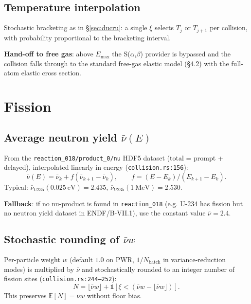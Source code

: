 \documentclass[11pt,a4paper]{article}
\begin{document}
\subsection{Temperature interpolation}

Stochastic bracketing as in \S\ref{sec:ducru}: a single $\xi$
selects $T_j$ or $T_{j+1}$ per collision, with probability
proportional to the bracketing interval.

\textbf{Hand-off to free gas}: above $E_\text{max}$ the
S($\alpha$,$\beta$) provider is bypassed and the collision
falls through to the standard free-gas elastic model
(\S4.2) with the full-atom elastic cross section.

\section{Fission}

\subsection{Average neutron yield $\bar{\nu}(E)$}

From the \texttt{reaction\_018/product\_0/nu} HDF5 dataset
(total = prompt + delayed), interpolated linearly in energy
(\texttt{collision.rs:156}):
\begin{equation}
\bar\nu(E) = \bar\nu_k + f(\bar\nu_{k+1} - \bar\nu_k),
\qquad f = (E - E_k)/(E_{k+1} - E_k).
\end{equation}
Typical: $\bar\nu_{U235}(0.025~\mathrm{eV}) = 2.435$,
$\bar\nu_{U235}(1~\mathrm{MeV}) = 2.530$.

\textbf{Fallback}: if no nu-product is found in
\texttt{reaction\_018} (e.g. U-234 has fission but no neutron
yield dataset in ENDF/B-VII.1), use the constant value
$\bar\nu = 2.4$.

\subsection{Stochastic rounding of $\bar\nu w$}

Per-particle weight $w$ (default $1.0$ on PWR, $1/N_\text{batch}$
in variance-reduction modes) is multiplied by $\bar\nu$ and
stochastically rounded to an integer number of fission sites
(\texttt{collision.rs:244--252}):
\begin{equation}
N = \lfloor \bar\nu w \rfloor +
\mathbb{1}\left[\xi < (\bar\nu w - \lfloor \bar\nu w \rfloor)\right].
\end{equation}
This preserves $\mathbb{E}[N] = \bar\nu w$ without floor bias.
\end{document}
